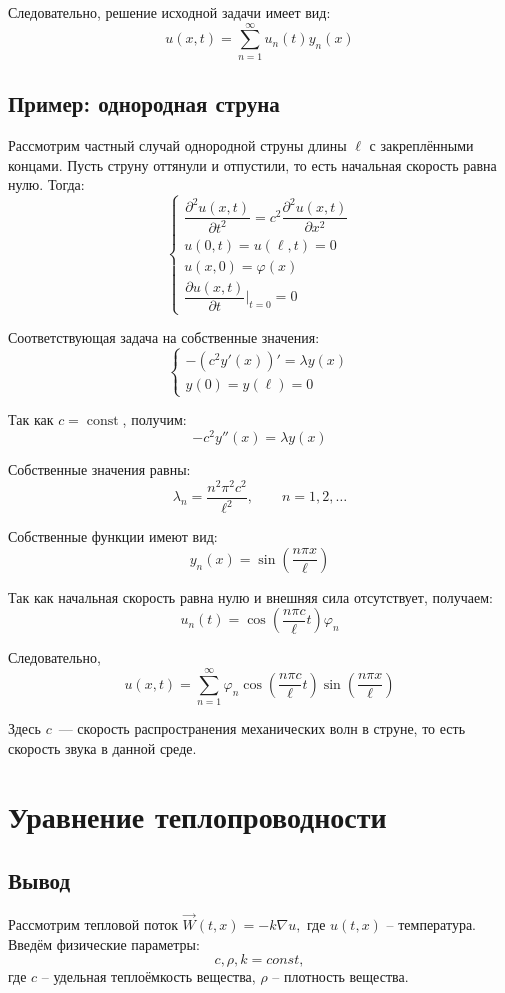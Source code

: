 \documentclass[11pt,a4paper]{report}
\numberwithin{equation}{section}
\numberwithin{figure}{chapter}
\numberwithin{table}{chapter}
\begin{document}
Следовательно, решение исходной задачи имеет вид:
\[
u(x,t)
=
\sum_{n=1}^{\infty}
u_n(t)y_n(x)
\]


\subsection{Пример: однородная струна}

Рассмотрим частный случай однородной струны длины $\ell$ с закреплёнными
концами. Пусть струну оттянули и отпустили, то есть начальная скорость
равна нулю. Тогда:
\[
\begin{cases}
\dfrac{\partial^2 u(x,t)}{\partial t^2}
=
c^2\dfrac{\partial^2 u(x,t)}{\partial x^2}
\\[1em]
u(0,t)=u(\ell,t)=0
\\[0.5em]
u(x,0)=\varphi(x)
\\[0.5em]
\dfrac{\partial u(x,t)}{\partial t}\bigg|_{t=0}=0
\end{cases}
\]

Соответствующая задача на собственные значения:
\[
\begin{cases}
-\left(c^2y'(x)\right)'=\lambda y(x)
\\[0.5em]
y(0)=y(\ell)=0
\end{cases}
\]

Так как $c=\operatorname{const}$, получим:
\[
-c^2y''(x)=\lambda y(x)
\]

Собственные значения равны:
\[
\lambda_n=\dfrac{n^2\pi^2c^2}{\ell^2},
\qquad n=1,2,\ldots
\]

Собственные функции имеют вид:
\[
y_n(x)=\sin\left(\dfrac{n\pi x}{\ell}\right)
\]

Так как начальная скорость равна нулю и внешняя сила отсутствует, получаем:
\[
u_n(t)
=
\cos\left(\dfrac{n\pi c}{\ell}t\right)\varphi_n
\]

Следовательно,
\[
u(x,t)
=
\sum_{n=1}^{\infty}
\varphi_n
\cos\left(\dfrac{n\pi c}{\ell}t\right)
\sin\left(\dfrac{n\pi x}{\ell}\right)
\]

Здесь $c$~--- скорость распространения механических волн в струне, то есть
скорость звука в данной среде.






\section{Уравнение теплопроводности}
\subsection{Вывод}
Рассмотрим тепловой поток $\vec{W}(t,x)=-k\nabla u,$ где $u(t,x)$ -- температура. Введём физические параметры: $$c,\rho, k = const,$$ где $c$ -- удельная теплоёмкость вещества, $\rho$ -- плотность вещества. 
\end{document}
